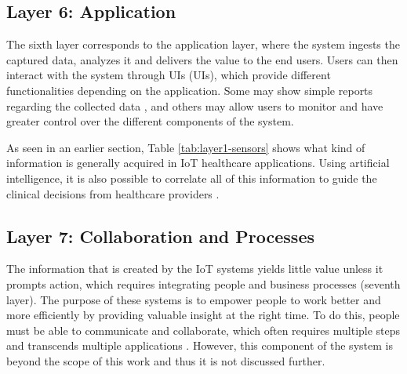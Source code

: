 
\subsection{Layer 6: Application}
\label{sec:iot-model-layer6}

The sixth layer corresponds to the application layer, where the system ingests the captured data, analyzes it and delivers the value to the end users. Users can then interact with the system through \acl{UI}s (\acs{UI}s), which provide different functionalities depending on the application. Some may show simple reports regarding the collected data \cite{Doukas2012, Wu2020}, and others may allow users to monitor and have greater control over the different components of the system. \bigskip

As seen in an earlier section, Table \ref{tab:layer1-sensors} shows what kind of information is generally acquired in \acs{IoT} healthcare applications. Using artificial intelligence, it is also possible to correlate all of this information to guide the clinical decisions from healthcare providers \cite{Gruendner2019, Wagholikar2017, Raposo2021}. \bigskip
\subsection{Layer 7: Collaboration and Processes}
\label{sec:iot-model-layer7}



The information that is created by the \acs{IoT} systems yields little value unless it prompts action, which requires integrating people and business processes (seventh layer). The purpose of these systems is to empower people to work better and more efficiently by providing valuable insight at the right time. To do this, people must be able to communicate and collaborate, which often requires multiple steps and transcends multiple applications \cite{Cisco2014}. However, this component of the system is beyond the scope of this work and thus it is not discussed further.

